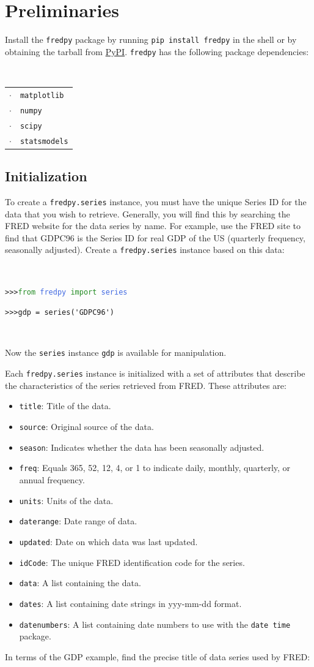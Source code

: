 \documentclass[11pt,fleqn]{article}
\newcommand{\IZ}{\begin{itemize}}
\newcommand{\ZI}{\end{itemize}}
\newcommand{\itemb}{\item[]}
\newcommand{\ttt}{\texttt}
\newcommand{\tc}{\textcolor}
\begin{document}
\section{Preliminaries}

Install the \ttt{fredpy} package by running \ttt{pip install fredpy} in the shell or by obtaining the tarball from \href{https://pypi.python.org/pypi/fredpy/0.1.0a}{PyPI}. \ttt{fredpy} has the following package dependencies:

\

\begin{tabular}{rl} 
 $\cdot$ & \ttt{matplotlib}\\
 $\cdot$ & \ttt{numpy}     \\
 $\cdot$ & \ttt{scipy}     \\ 
 $\cdot$ & \ttt{statsmodels}
\end{tabular}

\subsection{Initialization}

To create a \ttt{fredpy.series} instance, you must have the unique Series ID for the data that you wish to retrieve. Generally, you will find this by searching the FRED website for the data series by name. For example, use the FRED site to find that GDPC96 is the Series ID for real GDP of the US (quarterly frequency, seasonally adjusted). Create a \ttt{fredpy.series} instance based on this data:

\

\begin{minipage}{6.5in}
\ttt{>>>\tc{ForestGreen}{from} \tc{RoyalBlue}{fredpy} \tc{ForestGreen}{import} \tc{RoyalBlue}{series}}

\verb!>>>gdp = series('GDPC96')!
\end{minipage}

\

\noindent Now the \ttt{series} instance \ttt{gdp} is available for manipulation. 

Each \ttt{fredpy.series} instance is initialized with a set of attributes that describe the characteristics of the series retrieved from FRED. These attributes are:
	\IZ
	\itemb \ttt{title}: Title of the data.
	\itemb \ttt{source}: Original source of the data.
	\itemb \ttt{season}: Indicates whether the data has been seasonally adjusted.
	\itemb \ttt{freq}: Equals 365, 52, 12, 4, or 1 to indicate daily, monthly, quarterly, or annual frequency.
	\itemb \ttt{units}: Units of the data.
	\itemb \ttt{daterange}: Date range of data.
	\itemb \ttt{updated}: Date on which data was last updated.
	\itemb \ttt{idCode}: The unique FRED identification code for the series.
	\itemb \ttt{data}: A list containing the data.
	\itemb \ttt{dates}: A list containing date strings in yyy-mm-dd format.
	\itemb \ttt{datenumbers}: A list containing date numbers to use with the \ttt{date time} package.
	\ZI
In terms of the GDP example, find the precise title of data series used by FRED:
\end{document}
